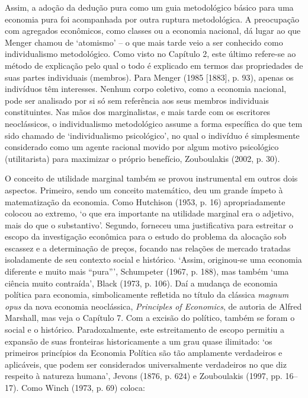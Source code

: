 \documentclass[12pt]{article}
\begin{document}
Assim, a adoção da dedução pura como um guia metodológico básico para uma economia pura foi acompanhada por outra ruptura metodológica. A preocupação com agregados econômicos, como classes ou a economia nacional, dá lugar ao que Menger chamou de ‘atomismo’ – o que mais tarde veio a ser conhecido como individualismo metodológico. Como visto no Capítulo 2, este último refere-se ao método de explicação pelo qual o todo é explicado em termos das propriedades de suas partes individuais (membros). Para Menger (1985 [1883], p. 93), apenas os indivíduos têm interesses. Nenhum corpo coletivo, como a economia nacional, pode ser analisado por si só sem referência aos seus membros individuais constituintes. Nas mãos dos marginalistas, e mais tarde com os escritores neoclássicos, o individualismo metodológico assume a forma específica do que tem sido chamado de ‘individualismo psicológico’, no qual o indivíduo é simplesmente considerado como um agente racional movido por algum motivo psicológico (utilitarista) para maximizar o próprio benefício, Zouboulakis (2002, p. 30).

O conceito de utilidade marginal também se provou instrumental em outros dois aspectos. Primeiro, sendo um conceito matemático, deu um grande ímpeto à matematização da economia. Como Hutchison (1953, p. 16) apropriadamente colocou ao extremo, ‘o que era importante na utilidade marginal era o adjetivo, mais do que o substantivo’. Segundo, forneceu uma justificativa para estreitar o escopo da investigação econômica para o estudo do problema da alocação sob escassez e a determinação de preços, focando nas relações de mercado tratadas isoladamente de seu contexto social e histórico. ‘Assim, originou-se uma economia diferente e muito mais “pura”’, Schumpeter (1967, p. 188), mas também ‘uma ciência muito contraída’, Black (1973, p. 106). Daí a mudança de economia política para economia, simbolicamente refletida no título da clássica \textit{magnum opus} da nova economia neoclássica, \textit{Principles of Economics}, de autoria de Alfred Marshall, mas veja o Capítulo 7. Com a excisão do político, também se foram o social e o histórico. Paradoxalmente, este estreitamento de escopo permitiu a expansão de suas fronteiras historicamente a um grau quase ilimitado: ‘os primeiros princípios da Economia Política são tão amplamente verdadeiros e aplicáveis, que podem ser considerados universalmente verdadeiros no que diz respeito à natureza humana’, Jevons (1876, p. 624) e Zouboulakis (1997, pp. 16–17). Como Winch (1973, p. 69) coloca:
\end{document}
